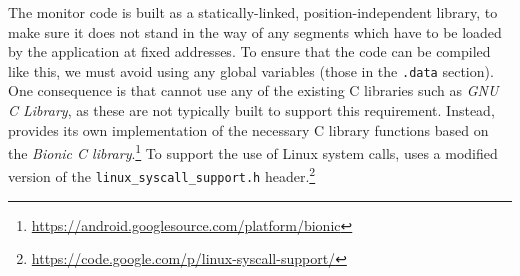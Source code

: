 The monitor code is built as a statically-linked,
position-independent library, to make sure it does not stand in the
way of any segments which have to be loaded by the application at
fixed addresses.  To ensure that the code can be compiled like this,
we must avoid using any global variables (\ie those in the
\lstinline`.data` section). One consequence is that \varan
cannot use any of the existing C libraries such as \textit{GNU C
  Library}, as these are not typically built to support this
requirement.  Instead, \varan provides its own implementation of the
necessary C library functions based on the \textit{Bionic C
  library}.\footnote{\url{https://android.googlesource.com/platform/bionic}}
To support the use of Linux system calls, \varan uses a modified
version of the \lstinline`linux_syscall_support.h`
header.\footnote{\url{https://code.google.com/p/linux-syscall-support/}}






